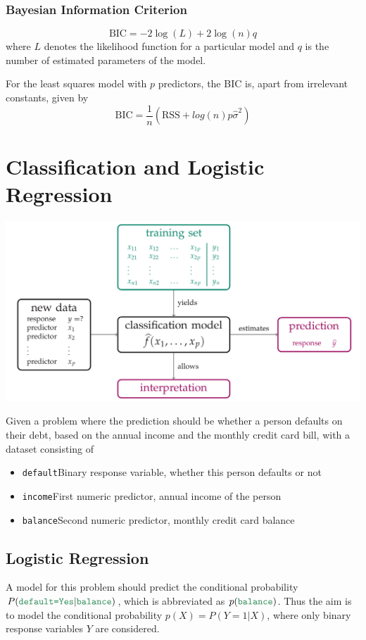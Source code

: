 \documentclass[11pt]{article}
\theoremstyle{definition}
\newcommand*\predvar[1]{{\color{SeaGreen4} \texttt{#1}}}
\begin{document}
\subsubsection{Bayesian Information Criterion}
\begin{equation*}
	\text{BIC} = -2\log(L) + 2\log(n)q
\end{equation*}
where $L$ denotes the likelihood function for a particular model and $q$ is the number of estimated parameters of the model.

For the least squares model with $p$ predictors, the BIC is, apart from irrelevant constants, given by
\begin{equation*}
	\text{BIC} = \frac{1}{n}\left( \text{RSS} + log(n)p\hat{\sigma}^2 \right)
\end{equation*}

\section{Classification and Logistic Regression}
\begin{center}
	\includegraphics[width=0.6\linewidth]{img/classification}
\end{center}

Given a problem where the prediction should be whether a person defaults on their debt, based on the annual income and the monthly credit card bill, with a dataset consisting of
\begin{itemize}
	\item \predvar{default}\qquad Binary response variable, whether this person defaults or not
	\item \predvar{income}\qquad First numeric predictor, annual income of the person
	\item \predvar{balance}\qquad Second numeric predictor, monthly credit card balance
\end{itemize}

\subsection{Logistic Regression}
A model for this problem should predict the conditional probability $P(\predvar{default=Yes}|\predvar{balance})$, which is abbreviated as $p(\predvar{balance})$. Thus the aim is to model the conditional probability $p(X) = P(Y=1|X)$, where only binary response variables $Y$ are considered.
\end{document}
